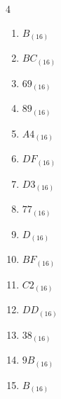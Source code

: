 \begin{multicols}{4}
\begin{enumerate}
        \phantom{$=27$}

  \item $B_{(16)}$

        \phantom{$=11$}

  \item $BC_{(16)}$

        \phantom{$=188$}

  \item $69_{(16)}$

        \phantom{$=105$}

  \item $89_{(16)}$

        \phantom{$=137$}

  \item $A4_{(16)}$

        \phantom{$=164$}

  \item $DF_{(16)}$

        \phantom{$=223$}

  \item $D3_{(16)}$

        \phantom{$=211$}

  \item $77_{(16)}$

        \phantom{$=119$}

  \item $D_{(16)}$

        \phantom{$=13$}

\columnbreak %

  \item $BF_{(16)}$

        \phantom{$=191$}

  \item $C2_{(16)}$

        \phantom{$=194$}

  \item $DD_{(16)}$

        \phantom{$=221$}

  \item $38_{(16)}$

        \phantom{$=56$}

  \item $9B_{(16)}$

        \phantom{$=155$}

  \item $B_{(16)}$

        \phantom{$=11$}


\end{enumerate}
\end{multicols}
